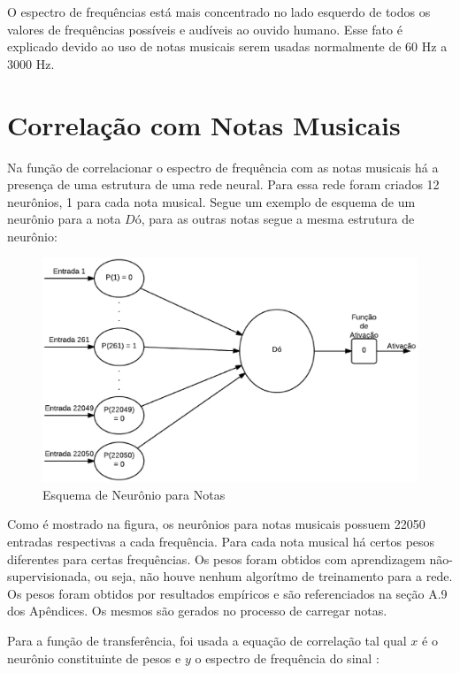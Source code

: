 O espectro de frequências está mais concentrado no lado esquerdo de todos os valores de frequências possíveis e audíveis ao ouvido humano. Esse fato é explicado devido ao uso de notas musicais serem usadas normalmente de 60 Hz a 3000 Hz.

\newpage
\section{Correlação com Notas Musicais}
\label{sec:correlacaonotas}

Na função de correlacionar o espectro de frequência com as notas musicais há a presença de uma estrutura de uma rede neural. Para essa rede foram criados 12 neurônios, 1 para cada nota musical. Segue um exemplo de esquema de um neurônio para a nota $Dó$, para as outras notas segue a mesma estrutura de neurônio:

\begin{figure}[h]
	\centering
		\includegraphics[keepaspectratio=true,scale=0.41]{figuras/neuron_notes}
	\caption{Esquema de Neurônio para Notas}
\end{figure}

Como é mostrado na figura, os neurônios para notas musicais possuem 22050 entradas respectivas a cada frequência. Para cada nota musical há certos pesos diferentes para certas frequências. Os pesos foram obtidos com aprendizagem não-supervisionada, ou seja, não houve nenhum algorítmo de treinamento para a rede. Os pesos foram obtidos por resultados empíricos e são referenciados na seção A.9 dos Apêndices. Os mesmos são gerados no processo de carregar notas.

Para a função de transferência, foi usada a equação de correlação tal qual $x$ é o neurônio constituinte de pesos e $y$ o espectro de frequência do sinal \cite{correlacao}:

